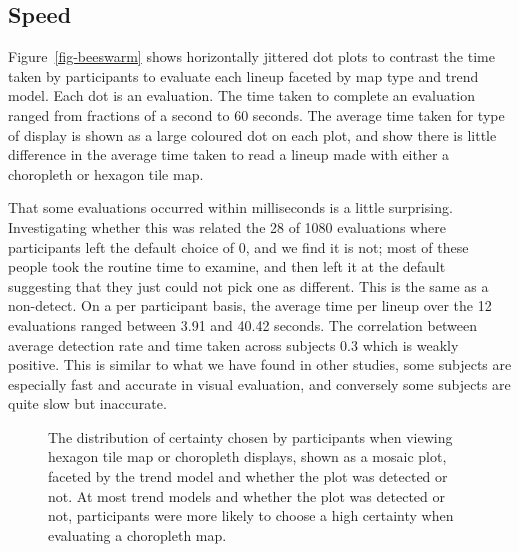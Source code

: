 \documentclass[
doublespace,
  times]{anzsauth}
\begin{document}
\subsection{Speed}\label{speed}

Figure~\ref{fig-beeswarm} shows horizontally jittered dot plots to
contrast the time taken by participants to evaluate each lineup faceted
by map type and trend model. Each dot is an evaluation. The time taken
to complete an evaluation ranged from fractions of a second to 60
seconds. The average time taken for type of display is shown as a large
coloured dot on each plot, and show there is little difference in the
average time taken to read a lineup made with either a choropleth or
hexagon tile map.

That some evaluations occurred within milliseconds is a little
surprising. Investigating whether this was related the 28 of 1080
evaluations where participants left the default choice of 0, and we find
it is not; most of these people took the routine time to examine, and
then left it at the default suggesting that they just could not pick one
as different. This is the same as a non-detect. On a per participant
basis, the average time per lineup over the 12 evaluations ranged
between 3.91 and 40.42 seconds. The correlation between average
detection rate and time taken across subjects 0.3 which is weakly
positive. This is similar to what we have found in other studies, some
subjects are especially fast and accurate in visual evaluation, and
conversely some subjects are quite slow but inaccurate.

\begin{figure}


\caption{\label{fig-certainty}The distribution of certainty chosen by
participants when viewing hexagon tile map or choropleth displays, shown
as a mosaic plot, faceted by the trend model and whether the plot was
detected or not. At most trend models and whether the plot was detected
or not, participants were more likely to choose a high certainty when
evaluating a choropleth map.}

\end{figure}%
\end{document}
